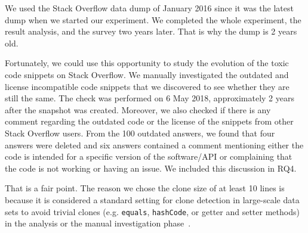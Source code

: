 \documentclass[a4paper,twoside,10pt]{reviewresponse}
\begin{document}

We used the Stack Overflow data dump of January 2016 since it was the latest
dump when we started our experiment. We completed the whole
experiment, the result analysis, and the survey two years later. That is why the
dump is 2 years old.

Fortunately, we could use this opportunity to study the evolution of the toxic
code snippets on Stack Overflow. We manually investigated the outdated and
license incompatible code snippets that we discovered to see whether they are
still the same. The check was performed on 6 May 2018, approximately 2 years
after the snapshot was created. Moreover, we also checked if there is any
comment regarding the outdated code or the license of the snippets from other
Stack Overflow users. From the 100 outdated answers, we found that four answers
were deleted and six answers contained a comment mentioning either the code is
intended for a specific version of the software/API or complaining that the code
is not working or having an issue. We included this discussion in RQ4.


That is a fair point. The reason we chose the clone size of at least 10 lines is
because it is considered a standard setting for clone detection in large-scale
data sets to avoid trivial clones (e.g. \texttt{equals}, \texttt{hashCode}, or
getter and setter methods) in the analysis or the manual investigation
phase~\citep{Sajnani2016}.
\end{document}
